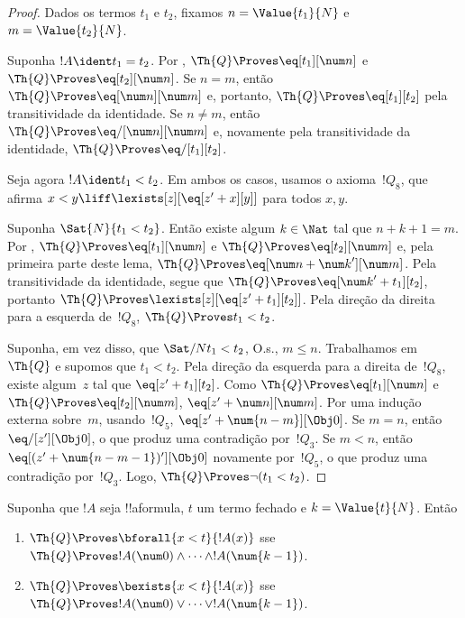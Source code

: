 \documentclass[../../../include/open-logic-section]{subfiles}
\begin{document}
\begin{proof}
Dados os termos $t_1$ e $t_2$, fixamos $n = \Value{t_1}{N}$ e
$m = \Value{t_2}{N}$.

Suponha $!A \ident t_1 = t_2$. Por ,
$\Th{Q} \Proves \eq[t_1][\num n]$ e $\Th{Q} \Proves \eq[t_2][\num n]$.
Se $n = m$, então $\Th{Q} \Proves \eq[\num n][\num m]$ e, portanto,
$\Th{Q} \Proves \eq[t_1][t_2]$ pela transitividade da identidade.
Se $n \neq m$, então $\Th{Q} \Proves \eq/[\num n][\num m]$ e,
novamente pela transitividade da identidade,
$\Th{Q} \Proves \eq/[t_1][t_2]$.

Seja agora $!A \ident t_1 < t_2$. Em ambos os casos, usamos o
axioma~$!Q_8$, que afirma $x < y \liff \lexists[z][\eq[z' + x][y]]$
para todos $x,y$.

Suponha $\Sat{N}{t_1 < t_2}$. Então existe algum $k \in \Nat$ tal que
$n + k + 1 = m$. Por ,
$\Th{Q} \Proves \eq[t_1][\num n]$ e $\Th{Q} \Proves \eq[t_2][\num m]$
e, pela primeira parte deste lema,
$\Th{Q} \Proves \eq[\num n + {\num k}'][\num m]$.
Pela transitividade da identidade, segue que
$\Th{Q} \Proves \eq[{\num k}' + t_1][t_2]$,
portanto $\Th{Q} \Proves \lexists[z][\eq[z' + t_1][t_2]]$.
Pela direção da direita para a esquerda de~$!Q_8$,
$\Th{Q} \Proves t_1 < t_2$.

Suponha, em vez disso, que $\Sat/{N}{t_1 < t_2}$, O.s.\@, $m \leq n$.
%
Trabalhamos em~$\Th{Q}$ e supomos que $t_1 < t_2$. Pela direção da
esquerda para a direita de~$!Q_8$, existe algum~$z$ tal que
$\eq[z' + t_1][t_2]$. Como $\Th{Q} \Proves \eq[t_1][\num n]$ e
$\Th{Q} \Proves \eq[t_2][\num m]$, $\eq[z' + \num n][\num m]$.
%
Por uma indução externa sobre~$m$, usando~$!Q_5$,
$\eq[z' + \num{n - m}][\Obj 0]$.
Se $m = n$, então $\eq/[z'][\Obj 0]$, o que produz uma contradição
por~$!Q_3$. Se $m < n$, então
$\eq[(z' + \num{n - m - 1})'][\Obj 0]$ novamente por~$!Q_5$, o que
produz uma contradição por~$!Q_3$. Logo,
$\Th{Q} \Proves \lnot(t_1 < t_2)$.
\end{proof}

\begin{lem}
Suponha que $!A$ seja !!a{formula}, $t$ um termo fechado e
$k=\Value{t}{N}$. Então
\begin{enumerate}
\item $\Th{Q} \Proves \bforall{x<t}{!A(x)}$ sse $\Th{Q} \Proves
    !A(\num 0) \land \dots \land !A(\num{k-1})$.
\item $\Th{Q} \Proves \bexists{x<t}{!A(x)}$ sse $\Th{Q} \Proves
    !A(\num 0) \lor \dots \lor !A(\num{k-1})$.
\end{enumerate}
\end{lem}
\end{document}

